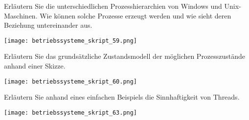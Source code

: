 \documentclass{article}
\begin{document}
\begin{tcolorbox}[colback=white!10!white,colframe=lightgray!75!black,
  savelowerto=\jobname_ex.tex,breakable,enhanced,lines before break=40]

\begin{center}
Erläutern Sie die unterschiedlichen Prozesshierarchien von Windows und Unix-Maschinen.
Wie können solche Prozesse erzeugt werden und wie sieht deren Beziehung untereinander aus.

\end{center}

\tcblower

\justifying
\begin{center}
\texttt{[image: betriebssysteme\_skript\_59.png]}
\end{center}

\end{tcolorbox}
\begin{tcolorbox}[colback=white!10!white,colframe=lightgray!75!black,
  savelowerto=\jobname_ex.tex,breakable,enhanced,lines before break=40]

\begin{center}
Erläutern Sie das grundsätzliche Zustandsmodell der möglichen Prozesszustände anhand einer Skizze.

\end{center}

\tcblower

\justifying
\begin{center}
\texttt{[image: betriebssysteme\_skript\_60.png]}
\end{center}

\end{tcolorbox}
\begin{tcolorbox}[colback=white!10!white,colframe=lightgray!75!black,
  savelowerto=\jobname_ex.tex,breakable,enhanced,lines before break=40]

\begin{center}
Erläutern Sie anhand eines einfachen Beispiels die Sinnhaftigkeit von Threads.

\end{center}

\tcblower

\justifying
\begin{center}
\texttt{[image: betriebssysteme\_skript\_63.png]}
\end{center}

\end{tcolorbox}
\end{document}
